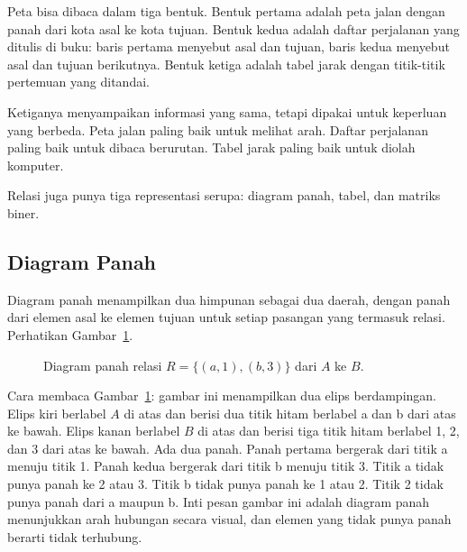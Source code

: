 \documentclass[11pt,a4paper]{article}
\begin{document}
Peta bisa dibaca dalam tiga bentuk. Bentuk pertama adalah peta jalan dengan panah dari kota asal ke kota tujuan. Bentuk kedua adalah daftar perjalanan yang ditulis di buku: baris pertama menyebut asal dan tujuan, baris kedua menyebut asal dan tujuan berikutnya. Bentuk ketiga adalah tabel jarak dengan titik-titik pertemuan yang ditandai.

Ketiganya menyampaikan informasi yang sama, tetapi dipakai untuk keperluan yang berbeda. Peta jalan paling baik untuk melihat arah. Daftar perjalanan paling baik untuk dibaca berurutan. Tabel jarak paling baik untuk diolah komputer.

Relasi juga punya tiga representasi serupa: diagram panah, tabel, dan matriks biner.

\subsection{Diagram Panah}

Diagram panah menampilkan dua himpunan sebagai dua daerah, dengan panah dari elemen asal ke elemen tujuan untuk setiap pasangan yang termasuk relasi. Perhatikan Gambar~\ref{fig:panah}.

\begin{figure}[H]
	\centering
	\caption{Diagram panah relasi $R=\{(a,1),(b,3)\}$ dari $A$ ke $B$.}
	\label{fig:panah}
\end{figure}

Cara membaca Gambar~\ref{fig:panah}: gambar ini menampilkan dua elips berdampingan. Elips kiri berlabel $A$ di atas dan berisi dua titik hitam berlabel a dan b dari atas ke bawah. Elips kanan berlabel $B$ di atas dan berisi tiga titik hitam berlabel 1, 2, dan 3 dari atas ke bawah. Ada dua panah. Panah pertama bergerak dari titik a menuju titik 1. Panah kedua bergerak dari titik b menuju titik 3. Titik a tidak punya panah ke 2 atau 3. Titik b tidak punya panah ke 1 atau 2. Titik 2 tidak punya panah dari a maupun b. Inti pesan gambar ini adalah diagram panah menunjukkan arah hubungan secara visual, dan elemen yang tidak punya panah berarti tidak terhubung.
\end{document}
